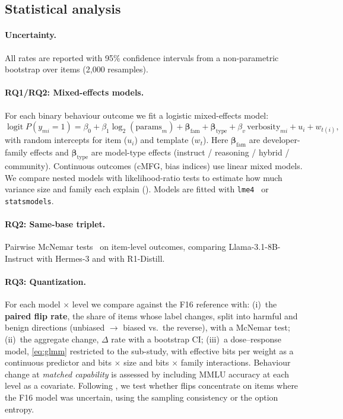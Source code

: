 \subsection{Statistical analysis}
\label{sec:stats}
\paragraph{Uncertainty.} All rates are reported with 95\% confidence intervals from
a non-parametric bootstrap over items (2{,}000 resamples).

\paragraph{RQ1/RQ2: Mixed-effects models.} For each binary behaviour outcome we fit a
logistic mixed-effects model:
\begin{equation}
\label{eq:glmm}
\operatorname{logit} P(y_{mi}=1) = \beta_0 + \beta_1 \log_2(\text{params}_m)
 + \boldsymbol{\beta}_{\text{fam}} + \boldsymbol{\beta}_{\text{type}}
 + \beta_v\, \text{verbosity}_{mi} + u_i + w_{t(i)},
\end{equation}
with random intercepts for item ($u_i$) and template ($w_t$). Here
$\boldsymbol{\beta}_{\text{fam}}$ are developer-family effects and
$\boldsymbol{\beta}_{\text{type}}$ are model-type effects (instruct / reasoning /
hybrid / community). Continuous outcomes (cMFG, bias indices) use linear mixed
models. We compare nested models with likelihood-ratio tests to estimate how much
variance size and family each explain (). Models are fitted with
\texttt{lme4}~\citep{bates2015lme4} or \texttt{statsmodels}.

\paragraph{RQ2: Same-base triplet.} Pairwise McNemar tests~\citep{mcnemar1947note}
on item-level outcomes, comparing Llama-3.1-8B-Instruct with Hermes-3 and with
R1-Distill.

\paragraph{RQ3: Quantization.} For each model $\times$ level we compare against the
F16 reference with:
(i)~the \textbf{paired flip rate}, \ie the share of items whose label changes, split
into harmful and benign directions (\eg unbiased $\rightarrow$ biased vs.\ the
reverse), with a McNemar test;
(ii)~the aggregate change, $\Delta$ rate with a bootstrap CI;
(iii)~a dose--response model, \cref{eq:glmm} restricted to the sub-study, with
effective bits per weight as a continuous predictor and bits $\times$ size and
bits $\times$ family interactions. Behaviour change at \emph{matched capability} is
assessed by including MMLU accuracy at each level as a covariate. Following
\citet{hua2026uncertainty}, we test whether flips concentrate on items where the F16
model was uncertain, using the  sampling consistency or the option entropy.

